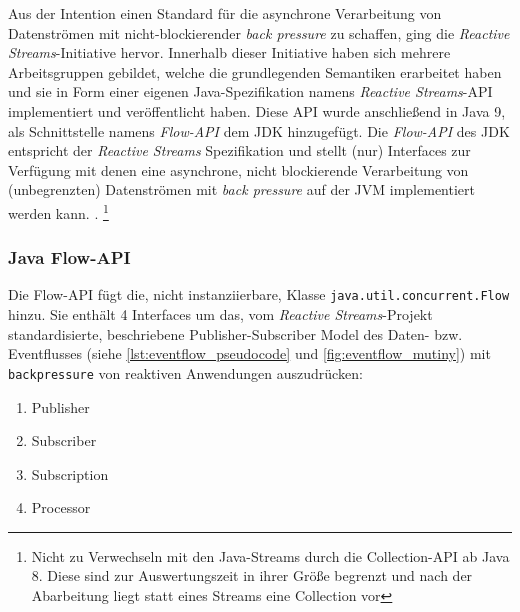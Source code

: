 Aus der Intention einen Standard für die asynchrone Verarbeitung von Datenströmen mit nicht-blockierender \textit{back pressure}
zu schaffen, ging die \textit{Reactive Streams}-Initiative hervor.
Innerhalb dieser Initiative haben sich mehrere Arbeitsgruppen gebildet, welche die grundlegenden Semantiken erarbeitet haben und
sie in Form einer eigenen Java-Spezifikation namens \textit{Reactive Streams}-API implementiert und veröffentlicht haben.\parencite{ReactiveStreams}
Diese API wurde anschließend in Java 9, als Schnittstelle namens \textit{Flow-API} dem JDK hinzugefügt.
Die \textit{Flow-API} des JDK entspricht der \textit{Reactive Streams} Spezifikation und stellt (nur) Interfaces zur Verfügung mit denen eine
asynchrone, nicht blockierende Verarbeitung von (unbegrenzten) Datenströmen mit \textit{back pressure} auf der JVM implementiert werden kann.
\parencite{OracleFlow}.
\footnote{Nicht zu Verwechseln mit den Java-Streams durch die Collection-API ab Java 8. Diese sind zur Auswertungszeit in ihrer Größe begrenzt und
	nach der Abarbeitung liegt statt eines Streams eine Collection vor}

\subsubsection{Java Flow-API}
\label{subsection:java_flow_api}
Die Flow-API fügt die, nicht instanziierbare, Klasse \verb|java.util.concurrent.Flow| hinzu. Sie enthält 4 Interfaces um das,
vom \textit{Reactive Streams}-Projekt standardisierte, beschriebene Publisher-Subscriber Model des Daten- bzw. Eventflusses
(siehe \ref{lst:eventflow_pseudocode} und \ref{fig:eventflow_mutiny}) mit \verb|backpressure|
von reaktiven Anwendungen auszudrücken:
\begin{enumerate}
	\item Publisher
	\item Subscriber
	\item Subscription
	\item Processor
\end{enumerate}


